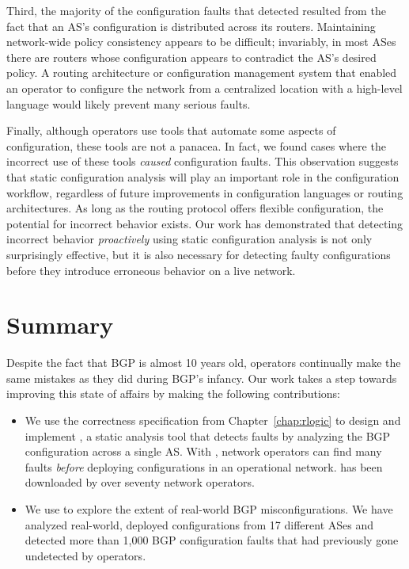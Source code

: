 %
Third, the majority of the configuration faults that \rcc detected
resulted from the fact that an AS's configuration is distributed across
its routers.  Maintaining network-wide policy consistency appears to be
difficult; invariably, in most ASes there are routers whose
configuration appears to contradict the AS's desired policy.  A routing
architecture or configuration management system that enabled an operator
to configure the network from a centralized location with a high-level
language would likely prevent many serious faults.

%
Finally, although operators use tools that automate some aspects of
configuration, these tools are not a panacea.  In fact, we found cases
where the incorrect use of these tools {\em caused} configuration
faults.  This observation suggests that static configuration
analysis will play an important role in the configuration
workflow, regardless of future improvements in configuration languages
or routing architectures.  As long as the routing protocol offers
flexible configuration, the potential for incorrect behavior exists.
Our work has demonstrated that detecting incorrect behavior {\em
proactively} using static configuration analysis is not only
surprisingly effective, but it is also necessary for detecting faulty
configurations before they introduce erroneous behavior on a live
network. 



\section{Summary}
\label{s:rcc_concl}


Despite the fact that BGP is almost 10 years old, operators continually make
the same mistakes as they did during BGP's infancy.   Our work takes a
step towards improving this state of 
affairs by making the following contributions:
\begin{itemize}
\itemsep=-1pt
\item We use the correctness specification from Chapter~\ref{chap:rlogic}
  to design and implement 
  \rccns, a static analysis tool that detects faults by analyzing the
  BGP configuration across a single AS.  With \rccns, network operators
  can find many faults {\em before} deploying configurations in
  an operational network.  \rcc has been downloaded by over seventy network
  operators.
\item We use \rcc to explore the extent of real-world BGP
      misconfigurations.  We have analyzed
      real-world, deployed configurations from 17 different ASes and
      detected more than 1,000 BGP configuration faults that had
      previously gone undetected by operators.
\end{itemize}



